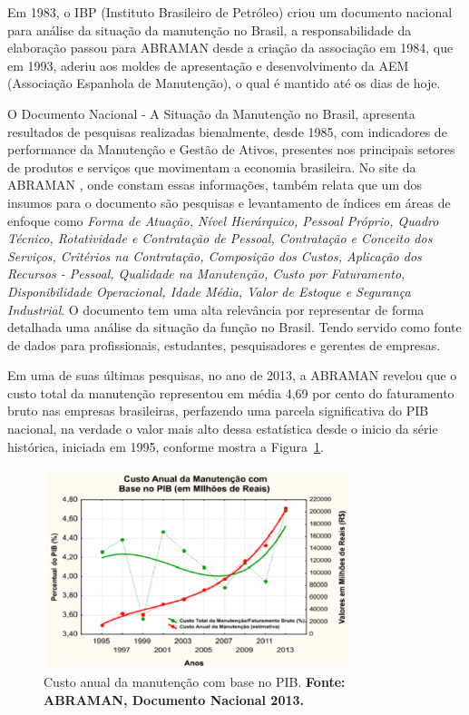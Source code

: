 Em 1983, o IBP (Instituto Brasileiro de Petróleo) criou um documento nacional para análise da situação da manutenção no Brasil, a responsabilidade da elaboração passou para ABRAMAN desde a criação da associação em 1984, que em 1993, aderiu aos moldes de apresentação e desenvolvimento da AEM (Associação Espanhola de Manutenção), o qual é mantido até os dias de hoje.  

O Documento Nacional - A Situação da Manutenção no Brasil, apresenta resultados de pesquisas realizadas bienalmente, desde 1985, com indicadores de performance da Manutenção e Gestão de Ativos, presentes nos principais setores de produtos e serviços que movimentam a economia brasileira. No site da ABRAMAN \cite{abraman}, onde constam essas informações, também relata que um dos insumos para o documento são pesquisas e levantamento de índices em áreas de enfoque como \emph{Forma de Atuação, Nível Hierárquico, Pessoal Próprio, Quadro Técnico, Rotatividade e Contratação de Pessoal, Contratação e Conceito dos Serviços, Critérios na Contratação, Composição dos Custos, Aplicação dos Recursos - Pessoal, Qualidade na Manutenção, Custo por Faturamento, Disponibilidade Operacional, Idade Média, Valor de Estoque e Segurança Industrial}. O documento tem uma alta relevância por representar de forma detalhada uma análise da situação da função no Brasil. Tendo servido como fonte de dados para profissionais, estudantes, pesquisadores e gerentes de empresas.

Em uma de suas últimas pesquisas, no ano de 2013, a ABRAMAN revelou que o custo total da manutenção representou em média 4,69 por cento do faturamento bruto nas empresas brasileiras, perfazendo uma parcela significativa do PIB nacional, na verdade o valor mais alto dessa estatística desde o inicio da série histórica, iniciada em 1995, conforme mostra a Figura~\ref{custo_anual_2013}.

\graphicspath{{figuras/}}
\begin{figure}[H]
\centering
\includegraphics[width=0.8\textwidth]{dados_pib_pesquisa_intro.eps}
\caption{Custo anual da manutenção com base no PIB. \textbf{Fonte: ABRAMAN, Documento Nacional 2013.}}
\label{custo_anual_2013}
\end{figure}

